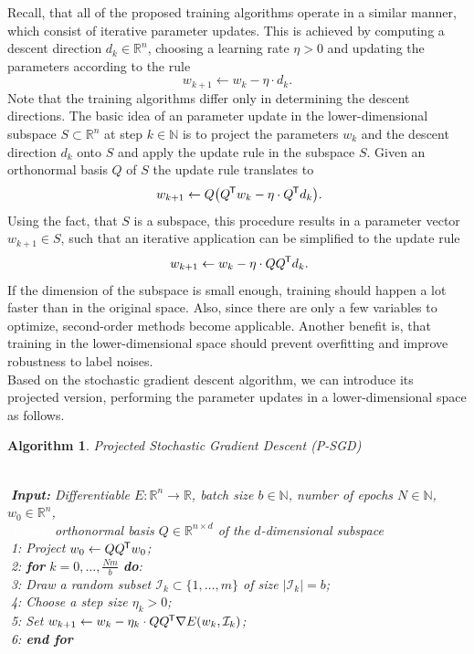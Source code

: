 \documentclass[11pt, a4paper]{article}
\newtheorem{algorithm}[theorem]{Algorithm}
\newcommand{\N}{\mathbb{N}}
\newcommand{\R}{\mathbb{R}}
\newcommand{\I}{\mathcal{I}}
\newcommand*{\tr}{^{\mkern-1.5mu\mathsf{T}}}
\begin{document}
Recall, that all of the proposed training algorithms operate in a similar manner, which consist of iterative parameter updates. This is achieved by computing a descent direction $d_k \in \R^n$, choosing a learning rate $\eta > 0$ and updating the parameters according to the rule
\[ w_{k+1} \leftarrow w_k - \eta \cdot d_k. \]
Note that the training algorithms differ only in determining the descent directions. The basic idea of an parameter update in the  lower-dimensional subspace $S \subset \R^n$ at step $k \in \N$ is to project the parameters $w_k$ and the descent direction $d_k$ onto $S$ and apply the update rule in the subspace $S$. Given an orthonormal basis $Q$ of $S$ the update rule translates to
\[ w_{k+1} \leftarrow Q \big ( Q \tr w_k - \eta \cdot Q \tr d_k \big ). \]
Using the fact, that $S$ is a subspace, this procedure results in a parameter vector $w_{k+1} \in S$, such that an iterative application can be simplified to the update rule
\[ w_{k+1} \leftarrow w_k - \eta \cdot Q Q \tr d_k. \]
If the dimension of the subspace is small enough, training should happen a lot faster than in the original space. Also, since there are only a few variables to optimize, second-order methods become applicable. Another benefit is, that training in the lower-dimensional space should prevent overfitting and improve robustness to label noises. \\

Based on the stochastic gradient descent algorithm, we can introduce its projected version, performing the parameter updates in a lower-dimensional space as follows.

\begin{algorithm}
\caption{Projected Stochastic Gradient Descent (P-SGD) \textcolor{white}{$\Big |$}} \ \\
\textcolor{white}{$\Big |$}\textbf{Input:} Differentiable $E: \R^n \to \R$, batch size $b \in \N$, number of epochs $N \in \N$, $w_0 \in \R^n$, \\
\textcolor{white}{$\Big |$\textbf{Input:}} orthonormal basis $Q \in \R^{n \times d}$ of the $d$-dimensional subspace \\
\textcolor{white}{$\Big |$}1: Project $w_0 \leftarrow QQ\tr w_0$; \\
\textcolor{white}{$\Big |$}2: \textbf{for} $k=0, \dots, \frac{Nm}{b}$ \textbf{do}: \\
\textcolor{white}{$\Big |$}3: \quad Draw a random subset $\I_k \subset \{1, \dots, m \}$ of size $| \I_k | = b$; \\
\textcolor{white}{$\Big |$}4: \quad Choose a step size $\eta_k > 0$; \\
\textcolor{white}{$\Big |$}5: \quad Set $w_{k+1} \leftarrow  w_k - \eta_k \cdot QQ\tr \nabla E(w_k,\I_k)$; \\
\textcolor{white}{$\Big |$}6: \textbf{end for}
\end{algorithm}
\end{document}
